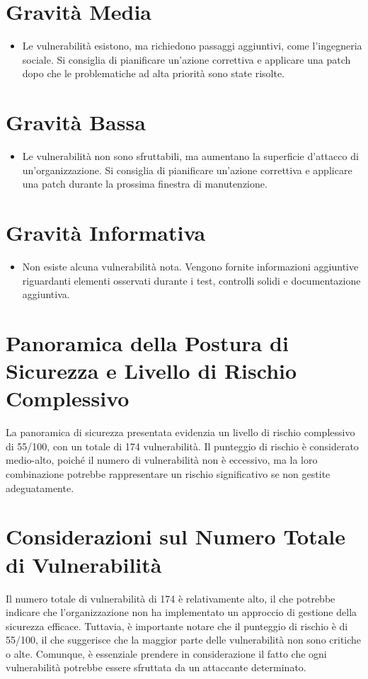 \section{Gravità Media}
\begin{itemize}
\item Le vulnerabilità esistono, ma richiedono passaggi aggiuntivi, come l'ingegneria sociale. Si consiglia di pianificare un'azione correttiva e applicare una patch dopo che le problematiche ad alta priorità sono state risolte.
\end{itemize}
\section{Gravità Bassa}
\begin{itemize}
\item Le vulnerabilità non sono sfruttabili, ma aumentano la superficie d'attacco di un'organizzazione. Si consiglia di pianificare un'azione correttiva e applicare una patch durante la prossima finestra di manutenzione.
\end{itemize}
\section{Gravità Informativa}
\begin{itemize}
\item Non esiste alcuna vulnerabilità nota. Vengono fornite informazioni aggiuntive riguardanti elementi osservati durante i test, controlli solidi e documentazione aggiuntiva.
\end{itemize}

\section{Panoramica della Postura di Sicurezza e Livello di Rischio Complessivo}

La panoramica di sicurezza presentata evidenzia un livello di rischio complessivo di 55/100, con un totale di 174 vulnerabilità. Il punteggio di rischio è considerato medio-alto, poiché il numero di vulnerabilità non è eccessivo, ma la loro combinazione potrebbe rappresentare un rischio significativo se non gestite adeguatamente.

\section{Considerazioni sul Numero Totale di Vulnerabilità}

Il numero totale di vulnerabilità di 174 è relativamente alto, il che potrebbe indicare che l'organizzazione non ha implementato un approccio di gestione della sicurezza efficace. Tuttavia, è importante notare che il punteggio di rischio è di 55/100, il che suggerisce che la maggior parte delle vulnerabilità non sono critiche o alte. Comunque, è essenziale prendere in considerazione il fatto che ogni vulnerabilità potrebbe essere sfruttata da un attaccante determinato.

